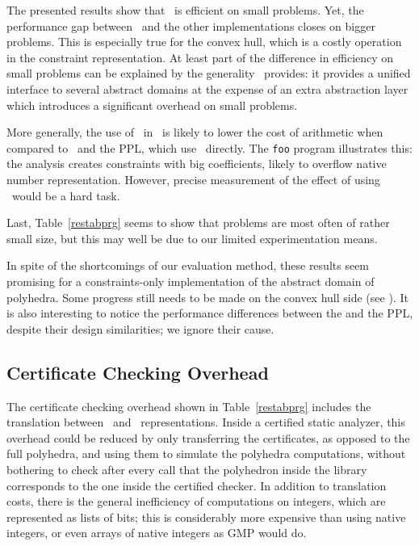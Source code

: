 The presented results show that \libpoly\ is efficient on small problems.
Yet, the performance gap between \libpoly\ and the other implementations closes on bigger problems.
This is especially true for the convex hull, which is a costly operation in the constraint representation.
At least part of the difference in efficiency on small problems can be explained by the generality \apron\ provides:
it provides a unified interface to several abstract domains at the expense of an extra abstraction layer
which introduces a significant overhead on small problems.

More generally, the use of \zarith\ in \libpoly\ is likely to lower the cost of arithmetic
when compared to \newpolka\ and the PPL, which use \gmp\ directly.
The \texttt{foo} program illustrates this: the analysis creates constraints with big coefficients,
likely to overflow native number representation.
However, precise measurement of the effect of using \zarith\ would be a hard task.

Last, Table~\ref{restabprg} seems to show that problems are most often of rather small size,
but this may well be due to our limited experimentation means.

In spite of the shortcomings of our evaluation method,
these results seem promising for a constraints-only implementation of the abstract domain of polyhedra.
Some progress still needs to be made on the convex hull side (see ).
It is also interesting to notice the performance differences between the {\newpolka} and the PPL, despite their design similarities; we ignore their cause.

\subsection{Certificate Checking Overhead}
The certificate checking overhead shown in Table~\ref{restabprg} includes
the translation between \ocaml\ and \coq\ representations.
Inside a certified static analyzer, this overhead could be reduced by only transferring the certificates, as opposed to the full polyhedra, and using them to simulate the polyhedra computations, without bothering to check after every call that the polyhedron inside the {\ocaml} library corresponds to the one inside the certified checker.
In addition to translation costs, there is the general inefficiency of computations on {\coq} integers, which are represented as lists of bits; this is considerably more expensive than using native integers, or even arrays of native integers as GMP would do.

